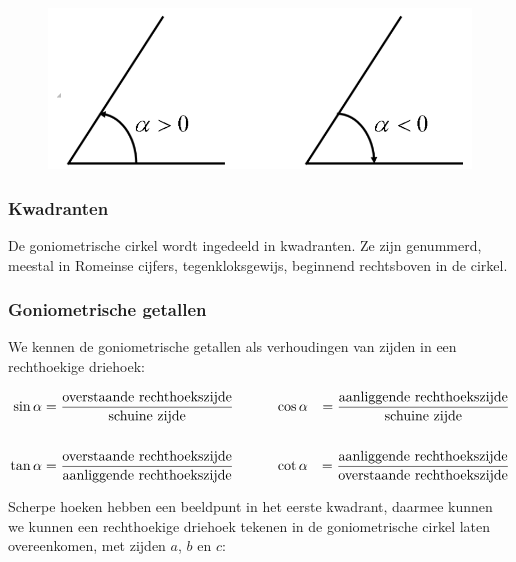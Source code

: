 \begin{figure}[h]
	\begin{center}
		\includegraphics[scale=0.4]{3_gonio_complexe_getallen/inputs/omwentelingshoeken.PNG}
	\end{center}
\end{figure}

\subsubsection{Kwadranten}

De goniometrische cirkel wordt ingedeeld in kwadranten.
Ze zijn genummerd, meestal in Romeinse cijfers, tegenkloksgewijs, beginnend rechtsboven in de cirkel.


\subsubsection{Goniometrische getallen}

We kennen de goniometrische getallen als verhoudingen van zijden in een rechthoekige driehoek:

\begin{align*}
\sin \alpha &= \frac{\textup{overstaande rechthoekszijde}}{\textup{schuine zijde}} &\qquad & \cos \alpha &= \frac{\textup{aanliggende rechthoekszijde}}{\textup{schuine zijde}}\\
&&\\
\tan \alpha &= \frac{\textup{overstaande rechthoekszijde}}{\textup{aanliggende rechthoekszijde}}&\qquad &\cot \alpha &= \frac{\textup{aanliggende rechthoekszijde}}{\textup{overstaande rechthoekszijde}}\\
\end{align*}

Scherpe hoeken hebben een beeldpunt in het eerste kwadrant, daarmee kunnen we kunnen een rechthoekige driehoek tekenen in de goniometrische cirkel laten overeenkomen, met zijden $a$, $b$ en $c$:

